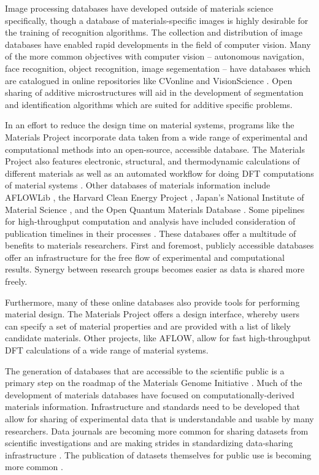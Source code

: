Image processing databases have developed outside of materials science specifically, though a database of materials-specific images is highly desirable for the training of recognition algorithms. The collection and distribution of image databases have enabled rapid developments in the field of computer vision. Many of the more common objectives with computer vision -- autonomous navigation, face recognition, object recognition, image segementation -- have databases which are catalogued in online repositories like CVonline \cite{CVonline} and VisionScience \cite{VisionScience}. Open sharing of additive microstructures will aid in the development of segmentation and identification algorithms which are suited for additive specific problems. 

In an effort to reduce the design time on material systems, programs like the Materials Project incorporate data taken from a wide range of experimental and computational methods into an open-source, accessible database. The Materials Project also features electronic, structural, and thermodynamic calculations of different materials as well as an automated workflow for doing DFT computations of material systems \cite{Jain2011, Jain2013}. Other databases of materials information include AFLOWLib \cite{Curtarolo2012, Curtarolo2012a}, the Harvard Clean Energy Project \cite{Hachmann2011}, Japan's National Institute of Material Science \cite{NIMS}, and the Open Quantum Materials Database \cite{Saal2013}. Some pipelines for high-throughput computation and analysis have included consideration of publication timelines in their processes \cite{Foster2015}. These databases offer a multitude of benefits to materials researchers. First and foremost, publicly accessible databases offer an infrastructure for the free flow of experimental and computational results. Synergy between research groups becomes easier as data is shared more freely.

Furthermore, many of these online databases also provide tools for performing material design. The Materials Project offers a design interface, whereby users can specify a set of material properties and are provided with a list of likely candidate materials. Other projects, like AFLOW, allow for fast high-throughput DFT calculations of a wide range of material systems. 

The generation of databases that are accessible to the scientific public is a primary step on the roadmap of the Materials Genome Initiative \cite{DePablo2014}. Much of the development of materials databases have focused on computationally-derived materials information. Infrastructure and standards need to be developed that allow for sharing of experimental data that is understandable and usable by many researchers. Data journals are becoming more common for sharing datasets from scientific investigations and are making strides in standardizing data-sharing infrastructure \cite{Wilkinson2016}. The publication of datasets themselves for public use is becoming more common \cite{DeJong2015, Kim2017}. 

